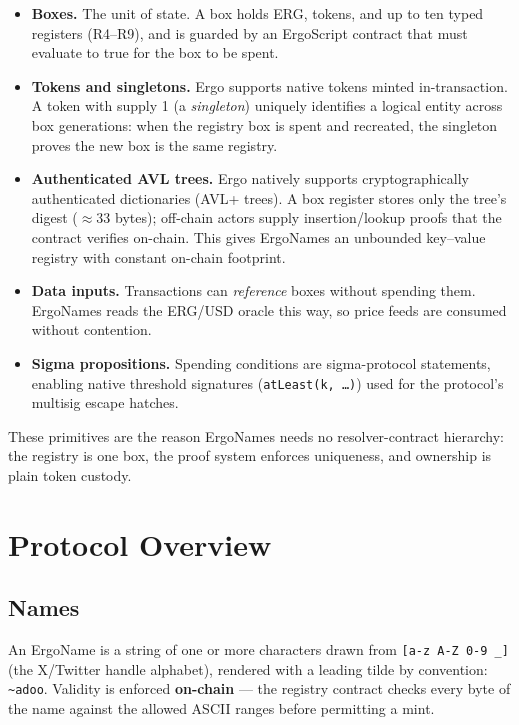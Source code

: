 \documentclass[11pt]{article}
\newcommand{\name}[1]{\texttt{\textasciitilde#1}}
\newcommand{\code}[1]{\texttt{#1}}
\begin{document}
\begin{itemize}
  \item \textbf{Boxes.} The unit of state. A box holds ERG, tokens, and up to
        ten typed registers (R4--R9), and is guarded by an ErgoScript contract
        that must evaluate to true for the box to be spent.
  \item \textbf{Tokens and singletons.} Ergo supports native tokens minted
        in-transaction. A token with supply 1 (a \emph{singleton}) uniquely
        identifies a logical entity across box generations: when the registry
        box is spent and recreated, the singleton proves the new box is the
        same registry.
  \item \textbf{Authenticated AVL trees.} Ergo natively supports
        cryptographically authenticated dictionaries (AVL+ trees). A box
        register stores only the tree's digest ($\approx$33 bytes); off-chain
        actors supply insertion/lookup proofs that the contract verifies
        on-chain. This gives ErgoNames an unbounded key--value registry with
        constant on-chain footprint.
  \item \textbf{Data inputs.} Transactions can \emph{reference} boxes without
        spending them. ErgoNames reads the ERG/USD oracle this way, so price
        feeds are consumed without contention.
  \item \textbf{Sigma propositions.} Spending conditions are sigma-protocol
        statements, enabling native threshold signatures
        (\code{atLeast(k, \ldots)}) used for the protocol's multisig escape
        hatches.
\end{itemize}

These primitives are the reason ErgoNames needs no resolver-contract
hierarchy: the registry is one box, the proof system enforces uniqueness, and
ownership is plain token custody.

\section{Protocol Overview}

\subsection{Names}

An ErgoName is a string of one or more characters drawn from
\code{[a-z A-Z 0-9 \_]} (the X/Twitter handle alphabet), rendered with a
leading tilde by convention: \name{adoo}. Validity is enforced
\textbf{on-chain} --- the registry contract checks every byte of the name
against the allowed ASCII ranges before permitting a mint.
\end{document}
